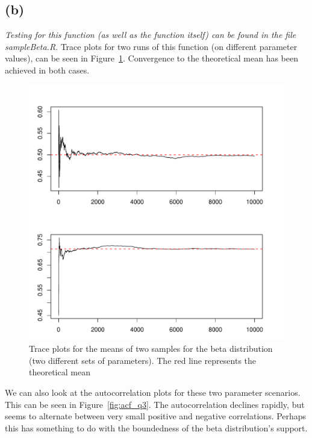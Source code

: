 \documentclass{article}\usepackage[]{graphicx}\usepackage[]{color}
\makeatletter
\def\maxwidth{ %
  \ifdim\Gin@nat@width>\linewidth
    \linewidth
  \else
    \Gin@nat@width
  \fi
}
\newenvironment{knitrout}{}{} %
\makeatother
\begin{document}
\subsection*{(b)}
\emph{Testing for this function (as well as the function itself) can be found in the file sampleBeta.R}.  Trace plots for two runs of this function (on different parameter values), can be seen in Figure~\ref{fig:trace_q3}.  Convergence to the theoretical mean has been achieved in both cases.

\begin{knitrout}
\color{fgcolor}\begin{figure}
\includegraphics[width=\maxwidth]{figure/trace_q3-1} \caption[Trace plots for the means of two samples for the beta distribution (two different sets of parameters)]{Trace plots for the means of two samples for the beta distribution (two different sets of parameters).  The red line represents the theoretical mean}\label{fig:trace_q3}
\end{figure}


\end{knitrout}

We can also look at the autocorrelation plots for these two parameter scenarios.  This can be seen in Figure~\ref{fig:acf_q3}.  The autocorrelation declines rapidly, but seems to alternate between very small positive and negative correlations.  Perhaps this has something to do with the boundedness of the beta distribution's support.
\end{document}

